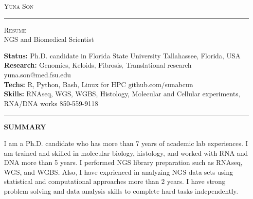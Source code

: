 \documentclass[10pt,A4]{article}
\newcommand{\cvsection}[1]
{
	\begin{center}
		\large\textcolor{sectcol}{\textbf{#1}}
	\end{center}
}
\newcommand{\metasection}[2]
{
\footnotesize{#2} \hspace*{\fill} \footnotesize{#1}\\[1pt]
}
\begin{document}
\pagestyle{fancy}	








\vspace{-8pt}
\begin{center}
	\HUGE \textsc{Yuna Son} \textcolor{sectcol}{\rule[-1mm]{1mm}{0.9cm}} \textsc{Resume}\\[2pt]
	\small NGS and Biomedical Scientist
\end{center}



\vspace{6pt}


\metasection{Tallahassee, Florida, USA}{\textbf{Status:} Ph.D. candidate in Florida State University}
\metasection{yuna.son@med.fsu.edu}{\textbf{Research:} Genomics, Keloids, Fibrosis, Translational research} 
\metasection{github.com/sunabcun}{\textbf{Techs:} R, Python, Bash, Linux for HPC}
\metasection{850-559-9118}{\textbf{Skills:} RNAseq, WGS, WGBS, Histology, Molecular and Cellular experiments, RNA/DNA works}
\vspace{-2pt}
\textcolor{softcol}{\hrule}
\vspace{6pt}

\normalsize

\vspace{-6pt}
\cvsection{SUMMARY}
{
\vspace{-6pt}
I am a Ph.D. candidate who has more than 7 years of academic lab experiences. I am trained and skilled in molecular biology, histology, and worked with RNA and DNA more than 5 years. I performed NGS library preparation such as RNAseq, WGS, and WGBS. Also, I have exprienced in analyzing NGS data sets using statistical and computational approaches more than 2 years. I have strong problem solving and data analysis skills to complete hard tasks independently.  
}
\end{document}
